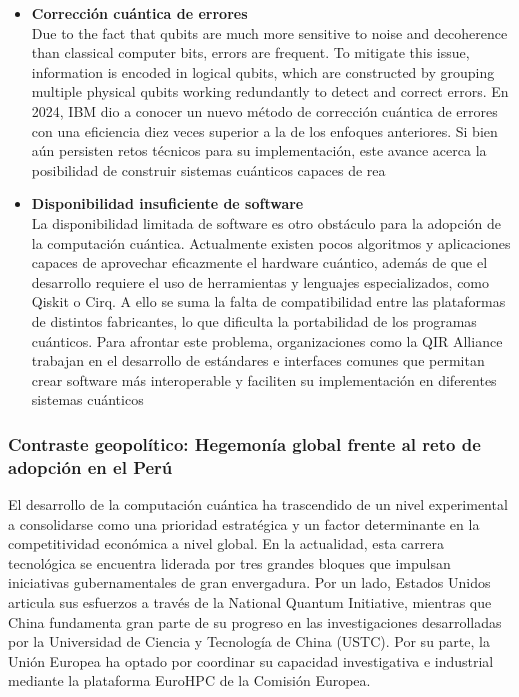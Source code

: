 \documentclass[12pt,a4paper]{article}
\begin{document}
\begin{itemize}
    \item \textbf{Corrección cuántica de errores}\\
    Due to the fact that qubits are much more sensitive to noise and decoherence than classical computer bits, errors are frequent. To mitigate this issue, information is encoded in logical qubits, which are constructed by grouping multiple physical qubits working redundantly to detect and correct errors. En 2024, IBM dio a conocer un nuevo método de corrección cuántica de errores con una eficiencia diez veces superior a la de los enfoques anteriores. Si bien aún persisten retos técnicos para su implementación, este avance acerca la posibilidad de construir sistemas cuánticos capaces de rea
    \item \textbf{Disponibilidad insuficiente de software}\\
    La disponibilidad limitada de software es otro obstáculo para la adopción de la computación cuántica. Actualmente existen pocos algoritmos y aplicaciones capaces de aprovechar eficazmente el hardware cuántico, además de que el desarrollo requiere el uso de herramientas y lenguajes especializados, como Qiskit o Cirq. A ello se suma la falta de compatibilidad entre las plataformas de distintos fabricantes, lo que dificulta la portabilidad de los programas cuánticos. Para afrontar este problema, organizaciones como la QIR Alliance trabajan en el desarrollo de estándares e interfaces comunes que permitan crear software más interoperable y faciliten su implementación en diferentes sistemas cuánticos
\end{itemize}
\subsubsection{Contraste geopolítico: Hegemonía global frente al reto de adopción en el Perú}
El desarrollo de la computación cuántica ha trascendido de un nivel experimental a consolidarse como una prioridad estratégica y un factor determinante en la competitividad económica a nivel global. En la actualidad, esta carrera tecnológica se encuentra liderada por tres grandes bloques que impulsan iniciativas gubernamentales de gran envergadura. Por un lado, Estados Unidos articula sus esfuerzos a través de la National Quantum Initiative, mientras que China fundamenta gran parte de su progreso en las investigaciones desarrolladas por la Universidad de Ciencia y Tecnología de China (USTC). Por su parte, la Unión Europea ha optado por coordinar su capacidad investigativa e industrial mediante la plataforma EuroHPC de la Comisión Europea. \\
\end{document}
